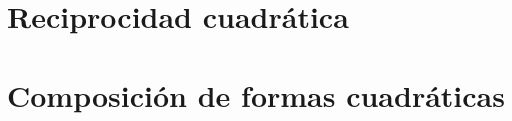 
\section{Reciprocidad cuadr\'atica}\label{sec:motiva:reciprocidad}


\section{Composici\'on de formas cuadr\'aticas}\label{sec:motiva:composicion}


